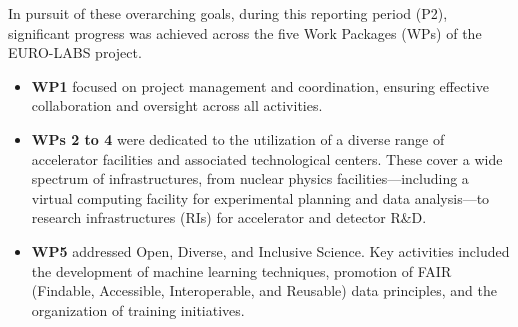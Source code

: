 In pursuit of these overarching goals,
during this reporting period (P2), significant progress was achieved across the five Work Packages (WPs) of the EURO-LABS project.

\begin{itemize}
    \item \textbf{WP1} focused on project management and coordination, ensuring effective collaboration and oversight across all activities.
    
    \item \textbf{WPs 2 to 4} were dedicated to the utilization of a diverse range of accelerator facilities and associated technological centers. These cover a wide spectrum of infrastructures, from nuclear physics facilities---including a virtual computing facility for experimental planning and data analysis---to research infrastructures (RIs) for accelerator and detector R\&D.
    
    \item \textbf{WP5} addressed Open, Diverse, and Inclusive Science. Key activities included the development of machine learning techniques, promotion of FAIR (Findable, Accessible, Interoperable, and Reusable) data principles, and the organization of training initiatives.
\end{itemize}

